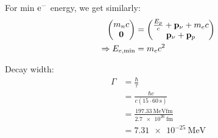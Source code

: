 \begin{parts}
	For min $\mathrm{e}^{-}$ energy, we get similarly:
	\begin{align*}
		\begin{pmatrix}
			m_n c \\
			\mathbf{0}
		\end{pmatrix}
		&= \begin{pmatrix}
			\frac{E_p}{c} + \mathbf{p}_\nu + m_e c \\
			\mathbf{p}_\nu + \mathbf{p}_p
		\end{pmatrix} \\
		\Rightarrow E_{e,\textnormal{min}} &= m_e c^2
	\end{align*}
	
	Decay width:
	\begin{align*}
		\Gamma &= \frac{\hbar}{\tau} \\
		&= \frac{\hbar c}{c(15 \cdot \SI{60}{\second})} \\
		&= \frac{\SI{197.33}{\mega\electronvolt\femto\metre}}{\SI{2.7e26}{\femto\metre}} \\
		&= \SI{7.31e-25}{\mega\electronvolt}
	\end{align*}
\end{parts}